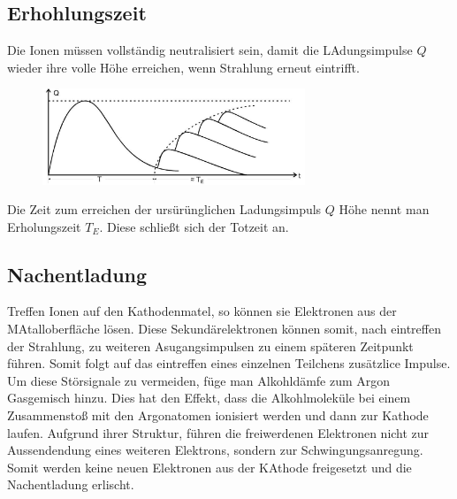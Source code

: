 \subsection{Erhohlungszeit}
Die Ionen müssen vollständig neutralisiert sein, damit die LAdungsimpulse $Q$ wieder
ihre volle Höhe erreichen, wenn Strahlung erneut eintrifft.
\begin{figure}[H]
    \centering
    \includegraphics[width=0.7\textwidth]{input/erhohlungszeit.jpg}
    \caption{\cite[223]{anleitung}}
\end{figure}
Die Zeit zum erreichen der ursürünglichen Ladungsimpuls $Q$ Höhe nennt man Erholungszeit $T_E$.
Diese schließt sich der Totzeit an.
\subsection{Nachentladung}
Treffen Ionen auf den Kathodenmatel, so können sie Elektronen aus der 
MAtalloberfläche lösen. Diese Sekundärelektronen können somit, nach eintreffen der Strahlung,
zu weiteren Asugangsimpulsen zu einem späteren Zeitpunkt führen. Somit folgt auf das
eintreffen eines einzelnen Teilchens zusätzlice Impulse.\\
Um diese Störsignale zu vermeiden, füge man Alkohldämfe zum Argon Gasgemisch hinzu.
Dies hat den Effekt, dass die Alkohlmoleküle bei einem Zusammenstoß mit den Argonatomen ionisiert werden
und dann zur Kathode laufen. Aufgrund ihrer Struktur, führen die freiwerdenen Elektronen nicht zur
Aussendendung eines weiteren Elektrons, sondern zur Schwingungsanregung.
Somit werden keine neuen Elektronen aus der KAthode freigesetzt und die Nachentladung erlischt. 

